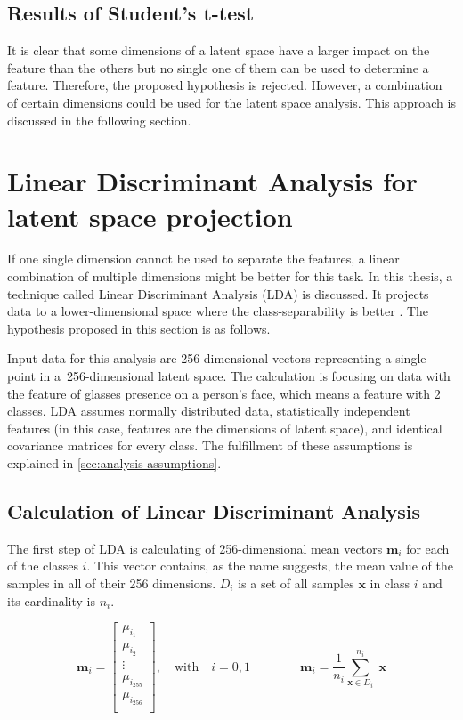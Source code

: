 \subsection*{Results of Student's t-test}
It is clear that some dimensions of a latent space have a larger impact on the feature than the others but no single one of them can be used to determine a feature. Therefore, the proposed hypothesis is rejected. However, a combination of certain dimensions could be used for the latent space analysis. This approach is discussed in the following section.

\section{\label{sec:lda}Linear Discriminant Analysis for latent space projection}
If one single dimension cannot be used to separate the features, a linear combination of multiple dimensions might be better for this task. In this thesis, a technique called Linear Discriminant Analysis (LDA) is discussed. It projects data to a lower-dimensional space where the class-separability is better \cite{duda2001patternclassification}. The hypothesis proposed in this section is as follows. 

Input data for this analysis are 256-dimensional vectors representing a single point in a~256-dimensional latent space. The calculation is focusing on data with the feature of glasses presence on a person's face, which means a feature with 2 classes. LDA assumes normally distributed data, statistically independent features (in this case, features are the dimensions of latent space), and identical covariance matrices for every class. The fulfillment of these assumptions is explained in \autoref{sec:analysis-assumptions}.

\subsection*{Calculation of Linear Discriminant Analysis}
The first step of LDA is calculating of 256-dimensional mean vectors $ \pmb m_i$ for each of the classes $i$. This vector contains, as the name suggests, the mean value of the samples in all of their 256 dimensions. $D_i$ is a set of all samples $\pmb x$ in class $i$ and its cardinality is $n_i$.

$$
\pmb m_i =
\begin{bmatrix}
    \mu_{i_{1}}\\
    \mu_{i_{2}}\\
    \vdots\\
    \mu_{i_{255}}\\
    \mu_{i_{256}}\\
\end{bmatrix},
\quad \text{with}\quad i = 0, 1
\quad \quad \quad \quad
\pmb m_i = \frac{1}{n_i} \sum\limits_{\pmb x \in D_i}^{n_i} \; \pmb x
$$

